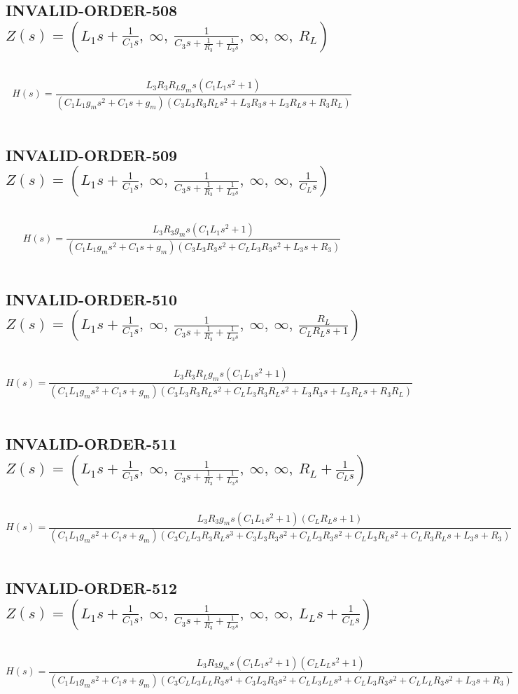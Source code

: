 \documentclass{article}
\begin{document}
\subsection{INVALID-ORDER-508 $Z(s) = \left( L_{1} s + \frac{1}{C_{1} s}, \  \infty, \  \frac{1}{C_{3} s + \frac{1}{R_{3}} + \frac{1}{L_{3} s}}, \  \infty, \  \infty, \  R_{L}\right)$ } \ 
\textbf{\[H(s) = \frac{L_{3} R_{3} R_{L} g_{m} s \left(C_{1} L_{1} s^{2} + 1\right)}{\left(C_{1} L_{1} g_{m} s^{2} + C_{1} s + g_{m}\right) \left(C_{3} L_{3} R_{3} R_{L} s^{2} + L_{3} R_{3} s + L_{3} R_{L} s + R_{3} R_{L}\right)}\] } \ 
\subsection{INVALID-ORDER-509 $Z(s) = \left( L_{1} s + \frac{1}{C_{1} s}, \  \infty, \  \frac{1}{C_{3} s + \frac{1}{R_{3}} + \frac{1}{L_{3} s}}, \  \infty, \  \infty, \  \frac{1}{C_{L} s}\right)$ } \ 
\textbf{\[H(s) = \frac{L_{3} R_{3} g_{m} s \left(C_{1} L_{1} s^{2} + 1\right)}{\left(C_{1} L_{1} g_{m} s^{2} + C_{1} s + g_{m}\right) \left(C_{3} L_{3} R_{3} s^{2} + C_{L} L_{3} R_{3} s^{2} + L_{3} s + R_{3}\right)}\] } \ 
\subsection{INVALID-ORDER-510 $Z(s) = \left( L_{1} s + \frac{1}{C_{1} s}, \  \infty, \  \frac{1}{C_{3} s + \frac{1}{R_{3}} + \frac{1}{L_{3} s}}, \  \infty, \  \infty, \  \frac{R_{L}}{C_{L} R_{L} s + 1}\right)$ } \ 
\textbf{\[H(s) = \frac{L_{3} R_{3} R_{L} g_{m} s \left(C_{1} L_{1} s^{2} + 1\right)}{\left(C_{1} L_{1} g_{m} s^{2} + C_{1} s + g_{m}\right) \left(C_{3} L_{3} R_{3} R_{L} s^{2} + C_{L} L_{3} R_{3} R_{L} s^{2} + L_{3} R_{3} s + L_{3} R_{L} s + R_{3} R_{L}\right)}\] } \ 
\subsection{INVALID-ORDER-511 $Z(s) = \left( L_{1} s + \frac{1}{C_{1} s}, \  \infty, \  \frac{1}{C_{3} s + \frac{1}{R_{3}} + \frac{1}{L_{3} s}}, \  \infty, \  \infty, \  R_{L} + \frac{1}{C_{L} s}\right)$ } \ 
\textbf{\[H(s) = \frac{L_{3} R_{3} g_{m} s \left(C_{1} L_{1} s^{2} + 1\right) \left(C_{L} R_{L} s + 1\right)}{\left(C_{1} L_{1} g_{m} s^{2} + C_{1} s + g_{m}\right) \left(C_{3} C_{L} L_{3} R_{3} R_{L} s^{3} + C_{3} L_{3} R_{3} s^{2} + C_{L} L_{3} R_{3} s^{2} + C_{L} L_{3} R_{L} s^{2} + C_{L} R_{3} R_{L} s + L_{3} s + R_{3}\right)}\] } \ 
\subsection{INVALID-ORDER-512 $Z(s) = \left( L_{1} s + \frac{1}{C_{1} s}, \  \infty, \  \frac{1}{C_{3} s + \frac{1}{R_{3}} + \frac{1}{L_{3} s}}, \  \infty, \  \infty, \  L_{L} s + \frac{1}{C_{L} s}\right)$ } \ 
\textbf{\[H(s) = \frac{L_{3} R_{3} g_{m} s \left(C_{1} L_{1} s^{2} + 1\right) \left(C_{L} L_{L} s^{2} + 1\right)}{\left(C_{1} L_{1} g_{m} s^{2} + C_{1} s + g_{m}\right) \left(C_{3} C_{L} L_{3} L_{L} R_{3} s^{4} + C_{3} L_{3} R_{3} s^{2} + C_{L} L_{3} L_{L} s^{3} + C_{L} L_{3} R_{3} s^{2} + C_{L} L_{L} R_{3} s^{2} + L_{3} s + R_{3}\right)}\] } \ 
\end{document}
